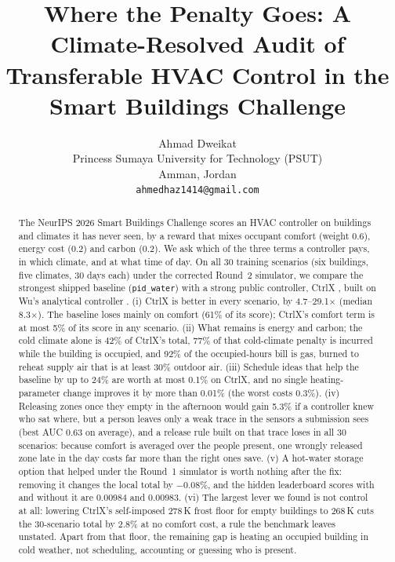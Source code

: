 \documentclass{article}
\title{Where the Penalty Goes: A Climate-Resolved Audit of\\ Transferable HVAC Control in the Smart Buildings Challenge}
\author{%
  Ahmad Dweikat\\
  Princess Sumaya University for Technology (PSUT)\\
  Amman, Jordan\\
  \texttt{ahmedhaz1414@gmail.com}
}
\begin{document}
\maketitle

\begin{abstract}
The NeurIPS 2026 Smart Buildings Challenge \cite{goldfeder2026} scores an HVAC controller on buildings and climates it has never seen, by a reward that mixes occupant comfort (weight 0.6), energy cost (0.2) and carbon (0.2). We ask which of the three terms a controller pays, in which climate, and at what time of day. On all 30 training scenarios (six buildings, five climates, 30 days each) under the corrected Round~2 simulator, we compare the strongest shipped baseline (\texttt{pid\_water}) with a strong public controller, CtrlX \cite{morev2026}, built on Wu's analytical controller \cite{wu2026}. (i) CtrlX is better in every scenario, by 4.7--29.1$\times$ (median 8.3$\times$). The baseline loses mainly on comfort (61\% of its score); CtrlX's comfort term is at most 5\% of its score in any scenario. (ii) What remains is energy and carbon; the cold climate alone is 42\% of CtrlX's total, 77\% of that cold-climate penalty is incurred while the building is occupied, and 92\% of the occupied-hours bill is gas, burned to reheat supply air that is at least 30\% outdoor air. (iii) Schedule ideas that help the baseline by up to 24\% are worth at most 0.1\% on CtrlX, and no single heating-parameter change improves it by more than 0.01\% (the worst costs 0.3\%). (iv) Releasing zones once they empty in the afternoon would gain 5.3\% if a controller knew who sat where, but a person leaves only a weak trace in the sensors a submission sees (best AUC 0.63 on average), and a release rule built on that trace loses in all 30 scenarios: because comfort is averaged over the people present, one wrongly released zone late in the day costs far more than the right ones save. (v) A hot-water storage option that helped under the Round~1 simulator is worth nothing after the fix: removing it changes the local total by $-0.08\%$, and the hidden leaderboard scores with and without it are 0.00984 and 0.00983. (vi) The largest lever we found is not control at all: lowering CtrlX's self-imposed 278\,K frost floor for empty buildings to 268\,K cuts the 30-scenario total by 2.8\% at no comfort cost, a rule the benchmark leaves unstated. Apart from that floor, the remaining gap is heating an occupied building in cold weather, not scheduling, accounting or guessing who is present.
\end{abstract}
\end{document}
